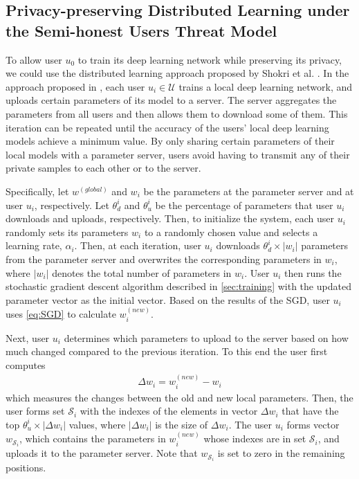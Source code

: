 \documentclass[conference]{IEEEtran}
\begin{document}
\subsection{Privacy-preserving Distributed Learning under the Semi-honest Users Threat Model}
To allow user $u_0$ to train its deep learning network while preserving its privacy, we could use the distributed
learning approach proposed by Shokri et al. \cite{shokri2015privacy}. 
In the approach proposed in \cite{shokri2015privacy}, each user $u_i\in\mathcal{U}$ trains a local deep learning
network, and uploads certain parameters of its model to a server. The server aggregates the parameters from all users and
then allows them to download some of them. This iteration can be repeated until the accuracy of the users' local deep learning models
achieve a minimum value.
By only sharing certain parameters of their local models
with a parameter server, users avoid having to transmit any of their private samples to each other or to the server.  


Specifically, let  $w^{(global)}$ and $w_i$ be the parameters at the parameter server and at user $u_i$, respectively. Let 
$\theta_d^{i}$ and $\theta_u^{i}$ be the percentage of parameters that user $u_i$ downloads and uploads, respectively. Then, 
to initialize the system,  each user $u_i$ randomly sets its parameters $w_i$ to a randomly chosen value and selects a learning rate,
$\alpha_i$. Then, at each iteration,  user $u_i$  downloads $\theta_d^{i} \times |w_i|$ parameters from the parameter server and
overwrites the corresponding parameters in $w_i$, where $|w_i|$ denotes the total number of parameters in $w_i$. User $u_i$ then runs
the stochastic gradient descent algorithm described in \ref{sec:training} with the updated parameter vector as the initial vector. 
Based on the results of the SGD,  user $u_i$ uses \eqref{eq:SGD} to calculate $w_i^{(new)}$.

Next, user $u_i$ determines which parameters to upload to the server based on how much changed compared to the previous iteration.  To
this end the user first computes
\begin{align}\label{eq:deltaParam}
\Delta w_i =  w_i^{(new)} -  w_i
\end{align}
which measures the changes between the old and new
local parameters. Then, the user forms set $\mathcal{S}_i$ with the indexes of the elements in vector $\Delta w_i$ that have the top 
$\theta_u^{i} \times |\Delta w_i|$ values, where $|\Delta w_i|$ is the size of $\Delta w_i$. 
The user $u_i$ forms vector $w_{\mathcal{S}_i}$, which contains the parameters in $w_i^{(new)}$ whose indexes are in
set $\mathcal{S}_i$, and uploads it to the parameter server. Note that $w_{\mathcal{S}_i}$  is set to zero in the remaining
positions. 
\end{document}
